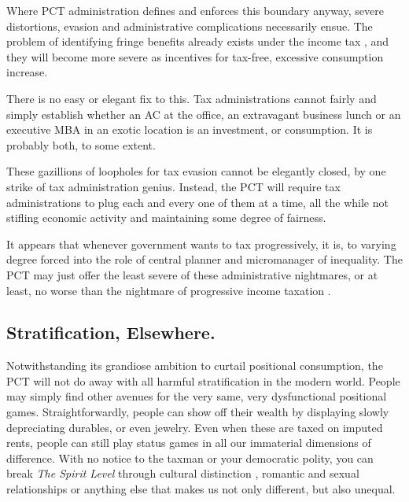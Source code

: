 
Where PCT administration defines and enforces this boundary anyway, severe distortions, evasion and administrative complications necessarily ensue.
The problem of identifying fringe benefits already exists under the income tax \citep[1591]{Graetz2009}, and they will become more severe as incentives for tax-free, excessive consumption increase.

There is no easy or elegant fix to this.
Tax administrations cannot fairly and simply establish whether an AC at the office, an extravagant business lunch or an executive MBA in an exotic location is an investment, or consumption.
It is probably both, to some extent.

These gazillions of loopholes for tax evasion cannot be elegantly closed, by one strike of tax administration genius.
Instead, the PCT will require tax administrations to plug each and every one of them at a time, all the while not stifling economic activity and maintaining some degree of fairness.

It appears that whenever government wants to tax progressively, it is, to varying degree forced into the role of central planner and micromanager of inequality.
The PCT may just offer the least severe of these administrative nightmares, or at least, no worse than the nightmare of progressive income taxation \citep[1595]{Graetz2009}.

\subsection{Stratification, Elsewhere.} Notwithstanding its grandiose ambition to curtail positional consumption, the PCT will not do away with all harmful stratification in the modern world.
People may simply find other avenues for the very same, very dysfunctional positional games.
Straightforwardly, people can show off their wealth by displaying slowly depreciating durables, or even jewelry.
Even when these are taxed on imputed rents, people can still play status games in all our immaterial dimensions of difference.
With no notice to the taxman or your democratic polity, you can break \emph{The Spirit Level} \citep{Pickett-2009-kx} through cultural distinction \citep{Bourdieu-1984-aa}, romantic and sexual relationships \citep{Mazur-1993-aa} or anything else that makes us not only different, but also unequal.

